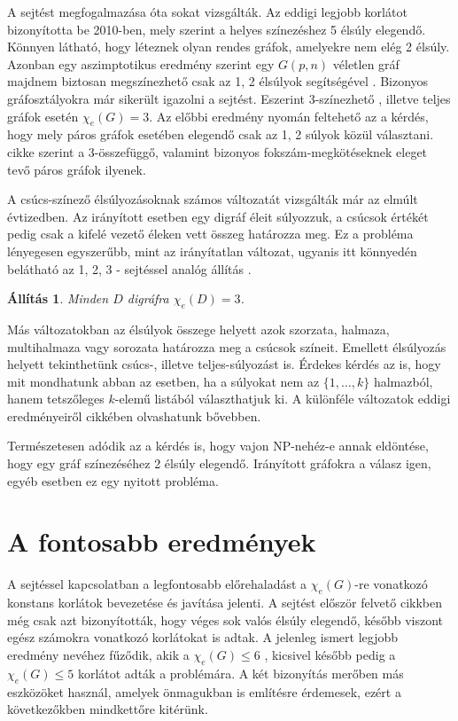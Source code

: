 \documentclass[12pt, a4paper]{report}
\newtheorem{áll}[tét]{Állítás}
\theoremstyle{remark}
\theoremstyle{definition}
\begin{document}
A sejtést megfogalmazása óta sokat vizsgálták. Az eddigi legjobb korlátot \citeauthor{Kalkowski2010} \cite{Kalkowski2010} bizonyította be 2010-ben, mely szerint a helyes színezéshez 5 élsúly elegendő. Könnyen látható, hogy léteznek olyan rendes gráfok, amelyekre nem elég 2 élsúly. Azonban egy aszimptotikus eredmény szerint egy $G(p, n)$ véletlen gráf majdnem biztosan megszínezhető csak az 1, 2 élsúlyok segítségével \cite{AddarioBerry2008}. Bizonyos gráfosztályokra már sikerült igazolni a sejtést. Eszerint 3-színezhető \cite{Karonski2004}, illetve teljes gráfok \cite{Alaeiyan2012} esetén $\chi_e(G) = 3$. Az előbbi eredmény nyomán feltehető az a kérdés, hogy mely páros gráfok esetében elegendő csak az 1, 2 súlyok közül választani. \citeauthor{Lu2011} \cite{Lu2011} cikke szerint a 3-összefüggő, valamint bizonyos fokszám-megkötéseknek eleget tevő páros gráfok ilyenek.

A csúcs-színező élsúlyozásoknak számos változatát vizsgálták már az elmúlt évtizedben. Az irányított esetben egy digráf éleit súlyozzuk, a csúcsok értékét pedig csak a kifelé vezető éleken vett összeg határozza meg. Ez a probléma lényegesen egyszerűbb, mint az irányítatlan változat, ugyanis itt könnyedén belátható az 1, 2, 3 - sejtéssel analóg állítás \cite{Baudon2014}.

\begin{áll}
Minden $D$ digráfra $\chi_e(D) = 3$.
\end{áll}

Más változatokban az élsúlyok összege helyett azok szorzata, halmaza, multihalmaza vagy sorozata határozza meg a csúcsok színeit. Emellett élsúlyozás helyett tekinthetünk csúcs-, illetve teljes-súlyozást is. Érdekes kérdés az is, hogy mit mondhatunk abban az esetben, ha a súlyokat nem az $\lbrace 1, \ldots, k \rbrace$ halmazból, hanem tetszőleges $k$-elemű listából választhatjuk ki. A különféle változatok eddigi eredményeiről \citeauthor{Seamone2012} \cite{Seamone2012} cikkében olvashatunk bővebben.

Természetesen adódik az a kérdés is, hogy vajon NP-nehéz-e annak eldöntése, hogy egy gráf színezéséhez 2 élsúly elegendő. Irányított gráfokra a válasz igen, egyéb esetben ez egy nyitott probléma.

\chapter{A fontosabb eredmények}

A sejtéssel kapcsolatban a legfontosabb előrehaladást a $\chi_e(G)$-re vonatkozó konstans korlátok bevezetése és javítása jelenti. A sejtést először felvető cikkben még csak azt bizonyították, hogy véges sok valós élsúly elegendő, később viszont egész számokra vonatkozó korlátokat is adtak. A jelenleg ismert legjobb eredmény \citeauthor{Kalkowski2010} nevéhez fűződik, akik a $\chi_e(G) \leq 6$ \cite{Kalkowski2009}, kicsivel később pedig a $\chi_e(G) \leq 5$ \cite{Kalkowski2010} korlátot adták a problémára. A két bizonyítás merőben más eszközöket használ, amelyek önmagukban is említésre érdemesek, ezért a következőkben mindkettőre kitérünk.
\end{document}
